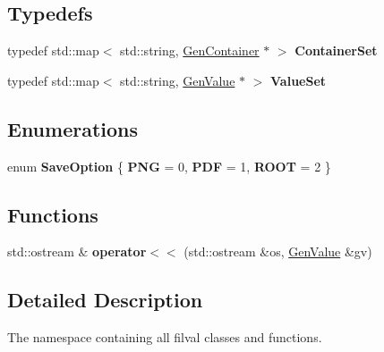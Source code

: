 \subsection*{Typedefs}
\begin{DoxyCompactItemize}
\item 
\hypertarget{namespacefv_a99804eba279e6002492d49bbd54e1938}{}\label{namespacefv_a99804eba279e6002492d49bbd54e1938} 
typedef std\+::map$<$ std\+::string, \hyperlink{classfv_1_1GenContainer}{Gen\+Container} $\ast$ $>$ {\bfseries Container\+Set}
\item 
\hypertarget{namespacefv_acc10056e9b78553b6a5b2110e63456e9}{}\label{namespacefv_acc10056e9b78553b6a5b2110e63456e9} 
typedef std\+::map$<$ std\+::string, \hyperlink{classfv_1_1GenValue}{Gen\+Value} $\ast$ $>$ {\bfseries Value\+Set}
\end{DoxyCompactItemize}
\subsection*{Enumerations}
\begin{DoxyCompactItemize}
\item 
\hypertarget{namespacefv_a16a191c4b8935d4c7c5aad79fc4ea97e}{}\label{namespacefv_a16a191c4b8935d4c7c5aad79fc4ea97e} 
enum {\bfseries Save\+Option} \{ {\bfseries P\+NG} = 0, 
{\bfseries P\+DF} = 1, 
{\bfseries R\+O\+OT} = 2
 \}
\end{DoxyCompactItemize}
\subsection*{Functions}
\begin{DoxyCompactItemize}
\item 
\hypertarget{namespacefv_a12225ad5af727a02b469015810b7f83f}{}\label{namespacefv_a12225ad5af727a02b469015810b7f83f} 
std\+::ostream \& {\bfseries operator$<$$<$} (std\+::ostream \&os, \hyperlink{classfv_1_1GenValue}{Gen\+Value} \&gv)
\end{DoxyCompactItemize}


\subsection{Detailed Description}
The namespace containing all filval classes and functions. 
